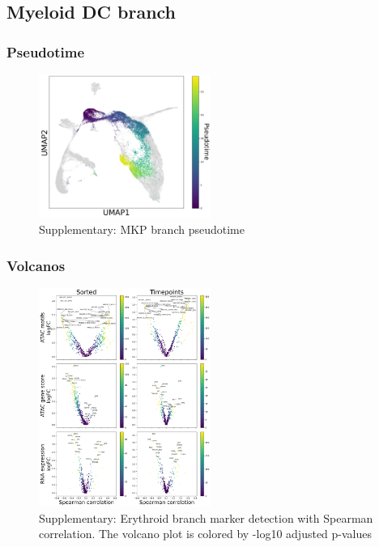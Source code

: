 \documentclass[a4paper]{article}
\begin{document}
\FloatBarrier
\subsection{Myeloid DC branch}

\subsubsection{Pseudotime}
\begin{figure}[!htb]
  \centering
  \includegraphics[width=0.5\textwidth]{../figures/hematopoiesis/Myeloid DC_40_107_single_branch_pseudotime.png}
  \caption{Supplementary: MKP branch pseudotime}
\end{figure}

\FloatBarrier
\subsubsection{Volcanos}

\begin{figure}[!htb]
  \centering
  \includegraphics[width=0.5\textwidth]{../figures/hematopoiesis/Myeloid DC_40_107_smooth_none_single_branch_volcanos_motifs.png}
  \caption{Supplementary: Erythroid branch marker detection with Spearman correlation. The volcano plot is colored by -log10 adjusted p-values}
\end{figure}
\end{document}
